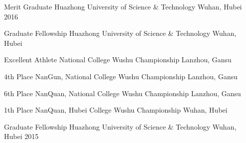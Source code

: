 


\vspace{-1.5mm}
\begin{cvhonors}


\cvhonor
{Merit Graduate } %
{Huazhong University of Science \& Technology} %
{Wuhan, Hubei} %
{2016} %


\cvhonor
{Graduate Fellowship} %
{Huazhong University of Science \& Technology} %
{Wuhan, Hubei} %
{ } %


\cvhonor
{Excellent Athlete} %
{National College Wushu Championship} %
{Lanzhou, Gansu} %
{ } %


\cvhonor
{4th Place} %
{NanGun, National College Wushu Championship} %
{Lanzhou, Gansu} %
{ } %


\cvhonor
{6th Place} %
{NanQuan, National College Wushu Championship} %
{Lanzhou, Gansu} %
{ } %


\cvhonor
{1th Place} %
{NanQuan, Hubei College Wushu Championship} %
{Wuhan, Hubei} %
{ } %


\cvhonor
{Graduate Fellowship} %
{Huazhong University of Science \& Technology} %
{Wuhan, Hubei} %
{2015} %



\end{cvhonors}
